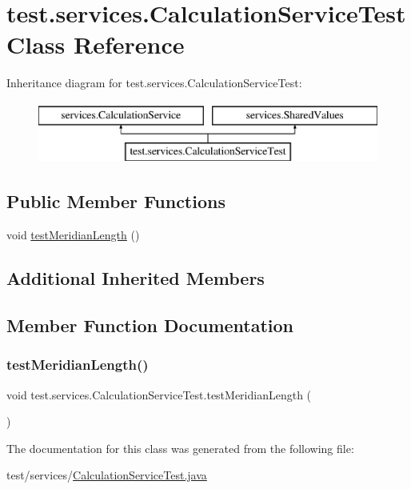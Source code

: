 \hypertarget{classtest_1_1services_1_1_calculation_service_test}{}\section{test.\+services.\+Calculation\+Service\+Test Class Reference}
\label{classtest_1_1services_1_1_calculation_service_test}
Inheritance diagram for test.\+services.\+Calculation\+Service\+Test\+:\begin{figure}[H]
\begin{center}
\leavevmode
\includegraphics[height=2.000000cm]{classtest_1_1services_1_1_calculation_service_test}
\end{center}
\end{figure}
\subsection*{Public Member Functions}
\begin{DoxyCompactItemize}
\item 
void \hyperlink{classtest_1_1services_1_1_calculation_service_test_a650039b16484fcf1c79200668b83aad2}{test\+Meridian\+Length} ()
\end{DoxyCompactItemize}
\subsection*{Additional Inherited Members}


\subsection{Member Function Documentation}
\mbox{\label{classtest_1_1services_1_1_calculation_service_test_a650039b16484fcf1c79200668b83aad2}} 
\subsubsection{\texorpdfstring{test\+Meridian\+Length()}{testMeridianLength()}}
{\footnotesize\ttfamily void test.\+services.\+Calculation\+Service\+Test.\+test\+Meridian\+Length (\begin{DoxyParamCaption}{ }\end{DoxyParamCaption})}



The documentation for this class was generated from the following file\+:\begin{DoxyCompactItemize}
\item 
test/services/\hyperlink{_calculation_service_test_8java}{Calculation\+Service\+Test.\+java}\end{DoxyCompactItemize}
